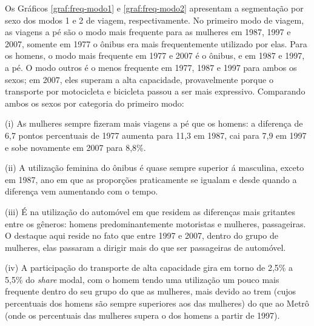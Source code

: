 Os Gráficos \ref{graf:freq-modo1} e \ref{graf:freq-modo2} apresentam a segmentação por sexo dos modos 1 e 2 de viagem, respectivamente.
No primeiro modo de viagem, as viagens a pé são o modo mais frequente para as mulheres em 1987, 1997 e 2007, somente em 1977 o ônibus era mais frequentemente utilizado por elas.
Para os homens, o modo mais frequente em 1977 e 2007 é o ônibus, e em 1987 e 1997, a pé.
O modo outros é o menos frequente em 1977, 1987 e 1997 para ambos os sexos; em 2007, eles superam a alta capacidade, provavelmente porque o transporte por motocicleta e bicicleta passou a ser mais expressivo.
Comparando ambos os sexos por categoria do primeiro modo:
\begin{compactitem}[]
\item (i) As mulheres sempre fizeram mais viagens a pé que os homens: a diferença de 6,7 pontos percentuais de 1977 aumenta para 11,3 em 1987, cai para 7,9 em 1997 e sobe novamente em 2007 para 8,8\%.
\item (ii) A utilização feminina do ônibus é quase sempre superior á masculina, exceto em 1987, ano em que as proporções praticamente se igualam e desde quando a diferença vem aumentando com o tempo.
\item (iii) É na utilização do automóvel em que residem as diferenças mais gritantes entre os gêneros: homens predominantemente motoristas e mulheres, passageiras. O destaque aqui reside no fato que entre 1997 e 2007, dentro do grupo de mulheres, elas passaram a dirigir mais do que ser passageiras de automóvel.
\item (iv) A participação do transporte de alta capacidade gira em torno de 2,5\% a 5,5\% do \textit{share} modal, com o homem tendo uma utilização um pouco mais frequente dentro do seu grupo do que as mulheres, mais devido ao trem (cujos percentuais dos homens são sempre superiores aos das mulheres) do que ao Metrô (onde os percentuais das mulheres supera o dos homens a partir de 1997).
\end{compactitem}

